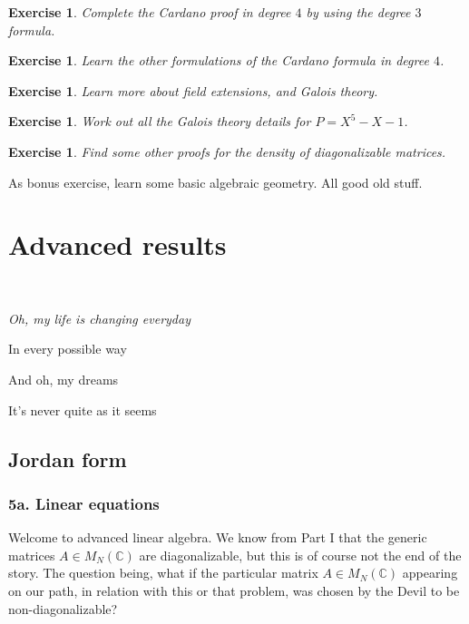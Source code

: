 \documentclass[12pt]{amsbook}
\newtheorem{exercise}[theorem]{Exercise}
\begin{document}
\begin{exercise}
Complete the Cardano proof in degree $4$ by using the degree $3$ formula.
\end{exercise}

\begin{exercise}
Learn the other formulations of the Cardano formula in degree $4$.
\end{exercise}

\begin{exercise}
Learn more about field extensions, and Galois theory.
\end{exercise}

\begin{exercise}
Work out all the Galois theory details for $P=X^5-X-1$.
\end{exercise}

\begin{exercise}
Find some other proofs for the density of diagonalizable matrices.
\end{exercise}

As bonus exercise, learn some basic algebraic geometry. All good old stuff.

\part{Advanced results}

\ \vskip50mm

\begin{center}
{\em Oh, my life is changing everyday

In every possible way

And oh, my dreams

It's never quite as it seems}
\end{center}

\chapter{Jordan form}

\section*{5a. Linear equations}

Welcome to advanced linear algebra. We know from Part I that the generic matrices $A\in M_N(\mathbb C)$ are diagonalizable, but this is of course not the end of the story. The question being, what if the particular matrix $A\in M_N(\mathbb C)$ appearing on our path, in relation with this or that problem, was chosen by the Devil to be non-diagonalizable?
\end{document}
